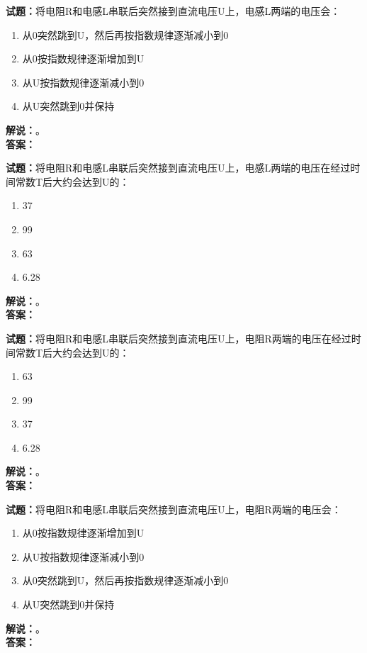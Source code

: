 \documentclass{ctexbook}
\begin{document}
\bigskip

\noindent\textbf{试题：}将电阻R和电感L串联后突然接到直流电压U上，电感L两端的电压会：
\begin{enumerate}[leftmargin=3em]
  \item 从0突然跳到U，然后再按指数规律逐渐减小到0
  \item 从0按指数规律逐渐增加到U
  \item 从U按指数规律逐渐减小到0
  \item 从U突然跳到0并保持
\end{enumerate}
\noindent\textbf{解说：}\textbf{}。\\\noindent\textbf{答案：}

\bigskip

\noindent\textbf{试题：}将电阻R和电感L串联后突然接到直流电压U上，电感L两端的电压在经过时间常数T后大约会达到U的：
\begin{enumerate}[leftmargin=3em]
  \item 37%
  \item 99%
  \item 63%
  \item 6.28%
\end{enumerate}
\noindent\textbf{解说：}\textbf{}。\\\noindent\textbf{答案：}

\bigskip

\noindent\textbf{试题：}将电阻R和电感L串联后突然接到直流电压U上，电阻R两端的电压在经过时间常数T后大约会达到U的：
\begin{enumerate}[leftmargin=3em]
  \item 63%
  \item 99%
  \item 37%
  \item 6.28%
\end{enumerate}
\noindent\textbf{解说：}\textbf{}。\\\noindent\textbf{答案：}

\bigskip

\noindent\textbf{试题：}将电阻R和电感L串联后突然接到直流电压U上，电阻R两端的电压会：
\begin{enumerate}[leftmargin=3em]
  \item 从0按指数规律逐渐增加到U
  \item 从U按指数规律逐渐减小到0
  \item 从0突然跳到U，然后再按指数规律逐渐减小到0
  \item 从U突然跳到0并保持
\end{enumerate}
\noindent\textbf{解说：}\textbf{}。\\\noindent\textbf{答案：}
\end{document}
